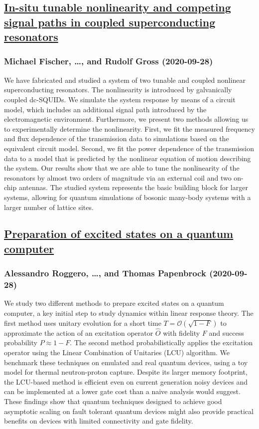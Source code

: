\subsection*{\href{http://arxiv.org/abs/2009.13492v1}{In-situ tunable nonlinearity and competing signal paths in coupled  superconducting resonators}}
\subsubsection*{Michael Fischer, \dots, and Rudolf Gross (2020-09-28)}
We have fabricated and studied a system of two tunable and coupled nonlinear
superconducting resonators. The nonlinearity is introduced by galvanically
coupled dc-SQUIDs. We simulate the system response by means of a circuit model,
which includes an additional signal path introduced by the electromagnetic
environment. Furthermore, we present two methods allowing us to experimentally
determine the nonlinearity. First, we fit the measured frequency and flux
dependence of the transmission data to simulations based on the equivalent
circuit model. Second, we fit the power dependence of the transmission data to
a model that is predicted by the nonlinear equation of motion describing the
system. Our results show that we are able to tune the nonlinearity of the
resonators by almost two orders of magnitude via an external coil and two
on-chip antennas. The studied system represents the basic building block for
larger systems, allowing for quantum simulations of bosonic many-body systems
with a larger number of lattice sites.

\subsection*{\href{http://arxiv.org/abs/2009.13485v1}{Preparation of excited states on a quantum computer}}
\subsubsection*{Alessandro Roggero, \dots, and Thomas Papenbrock (2020-09-28)}
We study two different methods to prepare excited states on a quantum
computer, a key initial step to study dynamics within linear response theory.
The first method uses unitary evolution for a short time
$T=\mathcal{O}(\sqrt{1-F})$ to approximate the action of an excitation operator
$\hat{O}$ with fidelity $F$ and success probability $P\approx1-F$. The second
method probabilistically applies the excitation operator using the Linear
Combination of Unitaries (LCU) algorithm. We benchmark these techniques on
emulated and real quantum devices, using a toy model for thermal neutron-proton
capture. Despite its larger memory footprint, the LCU-based method is efficient
even on current generation noisy devices and can be implemented at a lower gate
cost than a naive analysis would suggest. These findings show that quantum
techniques designed to achieve good asymptotic scaling on fault tolerant
quantum devices might also provide practical benefits on devices with limited
connectivity and gate fidelity.

